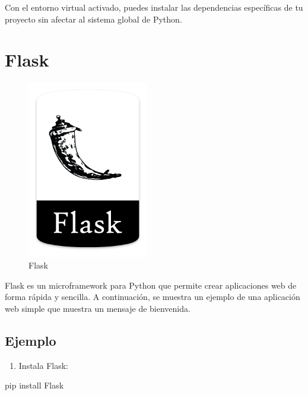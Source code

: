 \documentclass[
  a4paper,
  DIV=11,
  numbers=noendperiod,
  onepage,
  openany]{scrreprt}
\newenvironment{Shaded}{\begin{snugshade}}{\end{snugshade}}
\newcommand{\ExtensionTok}[1]{\textcolor[rgb]{0.00,0.23,0.31}{#1}}
\newcommand{\NormalTok}[1]{\textcolor[rgb]{0.00,0.23,0.31}{#1}}
\providecommand{\tightlist}{%
  \setlength{\itemsep}{0pt}\setlength{\parskip}{0pt}}\usepackage{longtable,booktabs,array}
\begin{document}
Con el entorno virtual activado, puedes instalar las dependencias
específicas de tu proyecto sin afectar al sistema global de Python.

\section{Flask}\label{flask}

\begin{figure}[H]

{\centering \includegraphics[width=2.08333in,height=\textheight,keepaspectratio]{unidades/unidad7/./images/flask_logo.png}

}

\caption{Flask}

\end{figure}%

Flask es un microframework para Python que permite crear aplicaciones
web de forma rápida y sencilla. A continuación, se muestra un ejemplo de
una aplicación web simple que muestra un mensaje de bienvenida.

\subsection{Ejemplo}\label{ejemplo-1}

\begin{enumerate}
\def\labelenumi{\arabic{enumi}.}
\tightlist
\item
  Instala Flask:
\end{enumerate}

\begin{Shaded}
\begin{Highlighting}[]
\ExtensionTok{pip}\NormalTok{ install Flask}
\end{Highlighting}
\end{Shaded}
\end{document}
